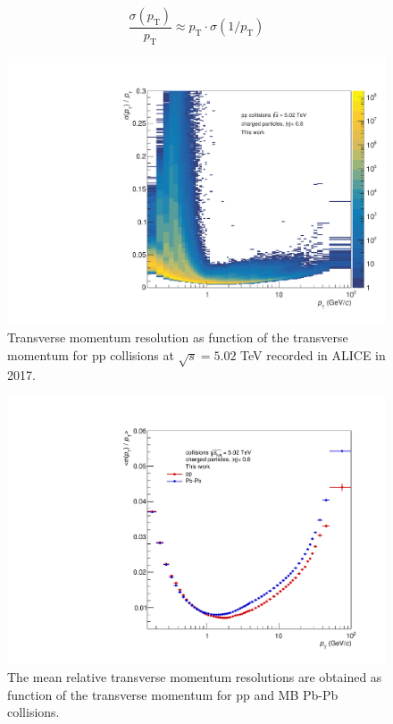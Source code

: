 \documentclass[12pt,a4paper]{report}
\begin{document}
\begin{equation}
\dfrac{\sigma(p_\text{T})}{p_\text{T}} \approx p_\text{T} \cdot \sigma(1/p_\text{T})
\end{equation}
\begin{figure}[tb!]
\centering
\includegraphics[width=12cm]{Plots/ptReso2D.pdf}  
\caption{Transverse momentum resolution as function of the transverse momentum for pp collisions at $\sqrt{s} = 5.02$ TeV recorded in ALICE in 2017.}
\label{ptReso2D}
\end{figure}
\begin{figure}[tb!]
\centering
\includegraphics[width=12cm]{Plots/ptReso1D.pdf}  
\caption{The mean relative transverse momentum resolutions are obtained as function of the transverse momentum for pp and MB Pb-Pb collisions.}
\label{ptReso1D}
\end{figure}
\end{document}
